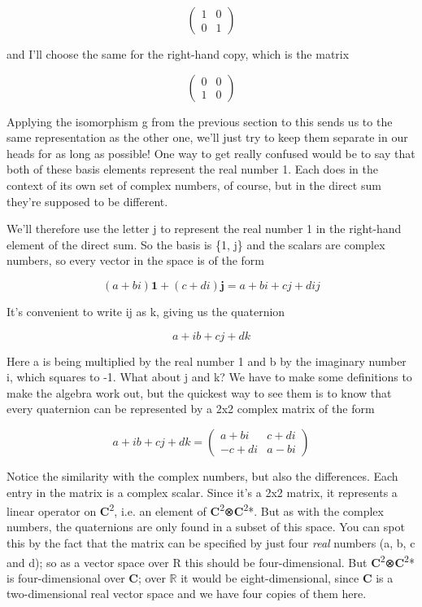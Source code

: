 \documentclass[oneside,english]{amsbook}
\numberwithin{section}{chapter}
\theoremstyle{plain}
\theoremstyle{definition}
\begin{document}
\[\begin{pmatrix}
	1 & 0 \\
	0 & 1
\end{pmatrix}\]

and I'll choose the same for the right-hand copy, which is the matrix

\[\begin{pmatrix}
	0 & 0 \\
	1 & 0
\end{pmatrix}\]

Applying the isomorphism g from the previous section to this sends us to
the same representation as the other one, we'll just try to keep them
separate in our heads for as long as possible! One way to get really
confused would be to say that both of these basis elements represent the
real number 1. Each does in the context of its own set of complex
numbers, of course, but in the direct sum they're supposed to be
different.

We'll therefore use the letter j to represent the real number 1 in the
right-hand element of the direct sum. So the basis is \{1, j\} and the
scalars are complex numbers, so every vector in the space is of the form

\[(a + bi)\mathbf{1} + (c + di)\mathbf{j =}a + bi + cj + dij\]

It's convenient to write ij as k, giving us the quaternion

\[a + ib + cj + dk\]

Here a is being multiplied by the real number 1 and b by the imaginary
number i, which squares to -1. What about j and k? We have to make some
definitions to make the algebra work out, but the quickest way to see
them is to know that every quaternion can be represented by a 2x2
complex matrix of the form

\[a + ib + cj + dk = \begin{pmatrix}
	a + bi & c + di \\
	- c + di & a - bi
\end{pmatrix}\]

Notice the similarity with the complex numbers, but also the
differences. Each entry in the matrix is a complex scalar. Since it's a
2x2 matrix, it represents a linear operator on
\textbf{C}\textsuperscript{2}, i.e. an element of
\textbf{C}\textsuperscript{2}⊗\textbf{C}\textsuperscript{2}*. But as
with the complex numbers, the quaternions are only found in a subset of
this space. You can spot this by the fact that the matrix can be
specified by just four \emph{real} numbers (a, b, c and d); so as a
vector space over R this should be four-dimensional. But
\textbf{C}\textsuperscript{2}⊗\textbf{C}\textsuperscript{2}* is
four-dimensional over \textbf{C}; over $\mathbb{R}$ it would be
eight-dimensional, since \textbf{C} is a two-dimensional real vector
space and we have four copies of them here.
\end{document}
